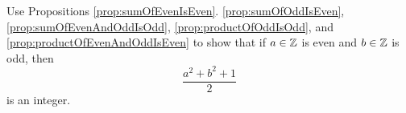 \guard







\begin{exercise}
\label{exercise:showExpressionIsInteger}
  Use Propositions \ref{prop:sumOfEvenIsEven}. \ref{prop:sumOfOddIsEven}, \ref{prop:sumOfEvenAndOddIsOdd}, \ref{prop:productOfOddIsOdd}, and \ref{prop:productOfEvenAndOddIsEven} to show that if $a\in\mathbb{Z}$ is even and $b\in\mathbb{Z}$ is odd, then \[ \frac{a^2+b^2+1}{2}\] is an integer.
\end{exercise}
